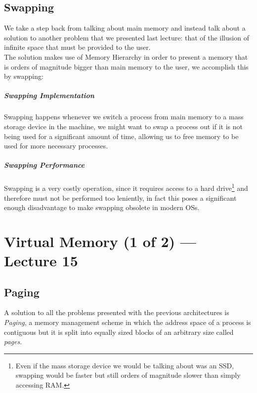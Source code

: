 \documentclass[openright, twoside]{report}
\theoremstyle{definition}
\theoremstyle{example}
\begin{document}
\section{Swapping}
	We take a step back from talking about main memory and instead talk about a 
	solution to another problem that we presented last lecture: that of the illusion 
	of infinite space that must be provided to the user.\\

	The solution makes use of Memory Hierarchy in order to present a memory that is 
	orders of magnitude bigger than main memory to the user, we accomplish this by 
	swapping:
	
	\paragraph{Swapping Implementation}
	
	Swapping happens whenever we switch a process from main memory to a mass storage 
	device in the machine, we might want to swap a process out if it is not being 
	used for a significant amount of time, allowing us to free memory to be used 
	for more necessary processes. 

	\paragraph{Swapping Performance}
	Swapping is a very costly operation, since it requires access to a hard drive\footnote{
		Even if the mass storage device we would be talking about was an SSD, swapping would be 
		faster but still orders of magnitude slower than simply accessing RAM.
	}
	and therefore must not be performed too leniently, in fact this poses a significant 
	enough disadvantage to make swapping obsolete in modern OSs.

\chapter{Virtual Memory (1 of 2) --- Lecture 15}
\section{Paging}

A solution to all the problems presented with the previous 
architectures is \emph{Paging}, a memory management scheme 
in which the address space of a process is contiguous but 
it is split into equally sized blocks of an arbitrary size 
called \emph{pages}.
\end{document}
